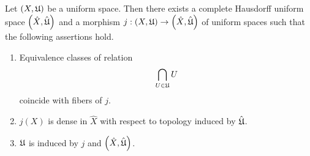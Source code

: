 \begin{theorem}\label{theorem:existence_of_completion}
Let $\left(X,{\mathfrak U}\right)$ be a uniform space. Then there exists a complete Hausdorff uniform space $\left(\hat{X},\hat{{\mathfrak U}}\right)$ and a morphism $j:\left(X,{\mathfrak U}\right)\rightarrow \left(\hat{X},\hat{{\mathfrak U}}\right)$ of uniform spaces such that the following assertions hold.
\begin{enumerate}[label=\emph{\textbf{(\arabic*)}}, leftmargin=*]
\item Equivalence classes of relation
$$\bigcap_{U\in {\mathfrak U}}U$$
coincide with fibers of $j$.
\item $j(X)$ is dense in $\hat{X}$ with respect to topology induced by $\hat{{\mathfrak U}}$.
\item ${\mathfrak U}$ is induced by $j$ and $\left(\hat{X},\hat{{\mathfrak U}}\right)$.
\end{enumerate}

\end{theorem}
